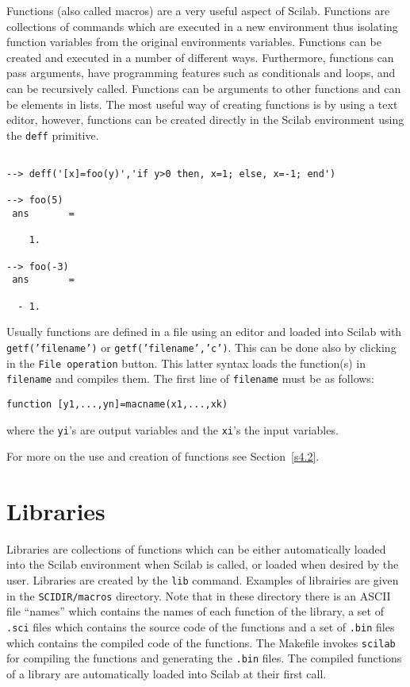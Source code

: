 	Functions (also called macros) are a very useful aspect 
of Scilab.  Functions
are collections of commands which are executed in a
new environment thus isolating function variables from the original
environments variables.  Functions
can be created and executed in a number of different ways.
Furthermore, functions can pass arguments, have programming features
such as conditionals and loops, and can be recursively called.
Functions can be arguments
to other functions and can be elements in lists.  The most useful
way of creating functions is by using a text editor, however, functions
can be created directly in the Scilab environment using the 
{\tt deff} primitive.
\begin{verbatim}
 
--> deff('[x]=foo(y)','if y>0 then, x=1; else, x=-1; end')
 
--> foo(5)
 ans       =
 
    1.  
 
--> foo(-3)
 ans       =
 
  - 1.  
\end{verbatim}
Usually functions are defined in a file using an editor and loaded
into Scilab with {\tt getf('filename')} or {\tt getf('filename','c')}.
This can be done also by clicking in the {\tt File operation} button.
This latter syntax loads the function(s) in {\tt filename} and compiles
them.
The first line of {\tt filename} must be as follows:
\begin{verbatim}
function [y1,...,yn]=macname(x1,...,xk)
\end{verbatim}
where the {\tt yi}'s are output variables and the {\tt xi}'s the
input variables.

For more on the use and creation of functions see Section~\ref{s4.2}.

\section{Libraries}
\label{s2.7}

	Libraries are collections of functions which can be either 
automatically loaded into the Scilab environment when
Scilab is called, or loaded when desired by the user.  
Libraries are created by the {\tt lib} command. Examples of librairies
are given in the {\tt SCIDIR/macros} directory. Note that in these
directory there is an ASCII file ``names'' which contains the names
of each function of the library, a set of {\tt .sci} files which
contains the source code of the functions and a set of {\tt .bin} files
which contains the compiled code of the functions. The Makefile invokes
{\tt scilab} for compiling the functions and generating the {\tt .bin}
files. The compiled functions of a library are automatically loaded 
into Scilab at their first call.


